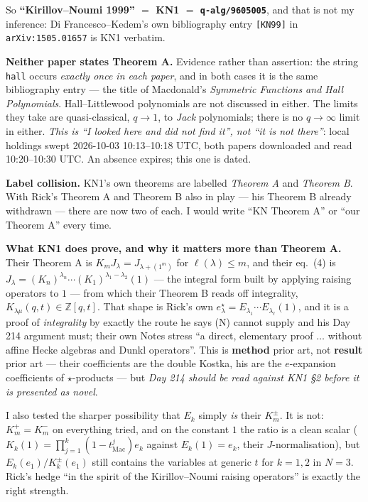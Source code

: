 \documentclass[11pt]{article}
\newcommand{\lam}{\lambda}
\newcommand{\estar}{e^{\star}}
\begin{document}
\noindent So \textbf{``Kirillov--Noumi 1999'' $=$ KN1 $=$ \texttt{q-alg/9605005}}, and that is
not my inference: Di Francesco--Kedem's own bibliography entry \texttt{[KN99]} in
\texttt{arXiv:1505.01657} is KN1 verbatim.

\textbf{Neither paper states Theorem A.} Evidence rather than assertion: the string
\texttt{hall} occurs \emph{exactly once in each paper}, and in both cases it is the same
bibliography entry --- the title of Macdonald's \emph{Symmetric Functions and Hall
Polynomials}. Hall--Littlewood polynomials are not discussed in either. The limits they take
are quasi-classical, $q\to1$, to \emph{Jack} polynomials; there is no $q\to\infty$ limit in
either. \emph{This is ``I looked here and did not find it'', not ``it is not there''}: local
holdings swept 2026-10-03 10:13--10:18 UTC, both papers downloaded and read 10:20--10:30 UTC.
An absence expires; this one is dated.

\textbf{Label collision.} KN1's own theorems are labelled \emph{Theorem A} and \emph{Theorem
B}. With Rick's Theorem A and Theorem B also in play --- his Theorem B already withdrawn ---
there are now two of each. I would write ``KN Theorem A'' or ``our Theorem A'' every time.

\textbf{What KN1 does prove, and why it matters more than Theorem A.} Their Theorem A is
$K_mJ_\lam=J_{\lam+(1^m)}$ for $\ell(\lam)\le m$, and their eq.~(4) is
$J_\lam=(K_n)^{\lam_n}\cdots(K_1)^{\lam_1-\lam_2}(1)$ --- the integral form built by applying
raising operators to $1$ --- from which their Theorem B reads off integrality,
$K_{\lam\mu}(q,t)\in\mathbb{Z}[q,t]$. That shape is Rick's own
$\estar_\lam=E_{\lam_1}\cdots E_{\lam_\ell}(1)$, and it is a proof of \emph{integrality} by
exactly the route he says (N) cannot supply and his Day 214 argument must; their own Notes
stress ``a direct, elementary proof $\ldots$ without affine Hecke algebras and Dunkl
operators''. This is \textbf{method} prior art, not \textbf{result} prior art --- their
coefficients are the double Kostka, his are the $e$-expansion coefficients of
$\star$-products --- but \emph{Day 214 should be read against KN1 \S2 before it is presented
as novel}.

I also tested the sharper possibility that $E_k$ simply \emph{is} their $K^\pm_m$. It is not:
$K^+_m=K^-_m$ on everything tried, and on the constant $1$ the ratio is a clean scalar
($K_k(1)=\prod_{j=1}^k(1-t_{\mathrm{Mac}}^j)e_k$ against $E_k(1)=e_k$, their
$J$-normalisation), but $E_k(e_1)/K^\pm_k(e_1)$ still contains the variables at generic $t$
for $k=1,2$ in $N=3$. Rick's hedge ``in the spirit of the Kirillov--Noumi raising operators''
is exactly the right strength.
\end{document}
